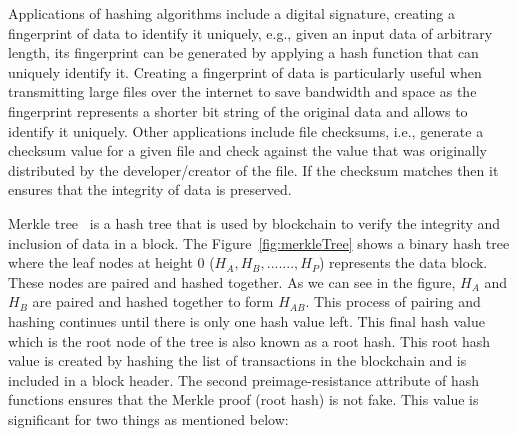 Applications of hashing algorithms include a digital signature, creating a
fingerprint of data to identify it uniquely, e.g., given an input data of
arbitrary length, its fingerprint can be generated by applying a hash function
that can uniquely identify it. Creating a fingerprint of data is particularly
useful when transmitting large files over the internet to save bandwidth and
space as the fingerprint represents a shorter bit string of the original data
and allows to identify it uniquely. Other applications include file checksums,
i.e., generate a checksum value for a given file and check against the value
that was originally distributed by the developer/creator of the file. If the
checksum matches then it ensures that the integrity of data is preserved. \par

Merkle tree~\cite{becker2008merkle} is a hash tree that is used by blockchain
to verify the integrity and inclusion of data in a block. The
Figure~\ref{fig:merkleTree} shows a binary hash tree where the leaf nodes at
height 0 ($H_{A}, H_{B}, ......., H_{P}$) represents the data block. These
nodes are paired and hashed together. As we can see in the figure, $H_A$ and
$H_{B}$ are paired and hashed together to form $H_{AB}$. This process of
pairing and hashing continues until there is only one hash value left. This
final hash value which is the root node of the tree is also known as a root
hash.  This root hash value is created by hashing the list of transactions in
the blockchain and is included in a block header. The second
preimage-resistance attribute of hash functions ensures that the Merkle proof
(root hash) is not fake. This value is significant for two things as mentioned
below:  
